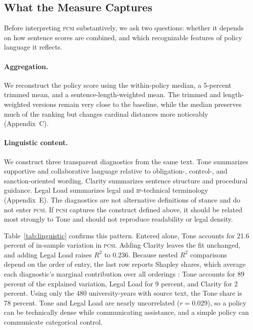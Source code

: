 \subsection{What the Measure Captures}

Before interpreting \textsc{pcsi} substantively, we ask two questions: whether it depends on how sentence scores are combined, and which recognizable features of policy language it reflects.

\paragraph{Aggregation.} We reconstruct the policy score using the within-policy median, a 5-percent trimmed mean, and a sentence-length-weighted mean. The trimmed and length-weighted versions remain very close to the baseline, while the median preserves much of the ranking but changes cardinal distances more noticeably (Appendix~C).

\paragraph{Linguistic content.} We construct three transparent diagnostics from the same text. Tone summarizes supportive and collaborative language relative to obligation-, control-, and sanction-oriented wording. Clarity summarizes sentence structure and procedural guidance. Legal Load summarizes legal and \textsc{ip}-technical terminology (Appendix~E). The diagnostics are not alternative definitions of stance and do not enter \textsc{pcsi}. If \textsc{pcsi} captures the construct defined above, it should be related most strongly to Tone and should not reproduce readability or legal density.

Table~\ref{tab:linguistic} confirms this pattern. Entered alone, Tone accounts for 21.6 percent of in-sample variation in \textsc{pcsi}. Adding Clarity leaves the fit unchanged, and adding Legal Load raises $R^2$ to 0.236. Because nested $R^2$ comparisons depend on the order of entry, the last row reports Shapley shares, which average each diagnostic's marginal contribution over all orderings \citep{lindeman1980introduction}: Tone accounts for 89 percent of the explained variation, Legal Load for 9 percent, and Clarity for 2 percent. Using only the 480 university-years with source text, the Tone share is 78 percent. Tone and Legal Load are nearly uncorrelated ($r = 0.029$), so a policy can be technically dense while communicating assistance, and a simple policy can communicate categorical control.

